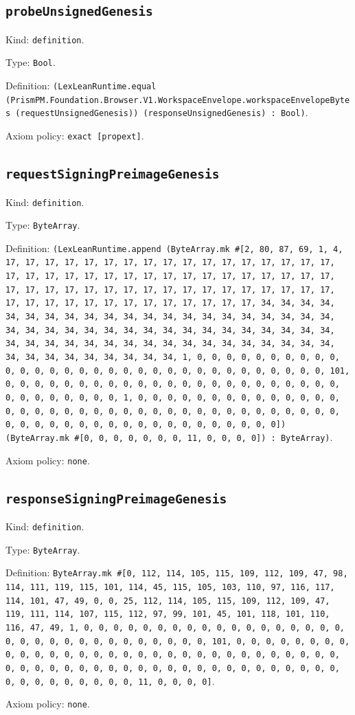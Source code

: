 \documentclass[11pt]{article}
\begin{document}
\subsection*{\texttt{probeUnsignedGenesis}}
\noindent Kind: \texttt{definition}.\par
\noindent Type: \texttt{Bool}.\par
\noindent Definition: \texttt{(LexLeanRuntime.equal (PrismPM.Foundation.Browser.V1.WorkspaceEnvelope.workspaceEnvelopeBytes (requestUnsignedGenesis)) (responseUnsignedGenesis) : Bool)}.\par
\noindent Axiom policy: \texttt{exact [propext]}.\par
\subsection*{\texttt{requestSigningPreimageGenesis}}
\noindent Kind: \texttt{definition}.\par
\noindent Type: \texttt{ByteArray}.\par
\noindent Definition: \texttt{(LexLeanRuntime.append (ByteArray.mk \#[2, 80, 87, 69, 1, 4, 17, 17, 17, 17, 17, 17, 17, 17, 17, 17, 17, 17, 17, 17, 17, 17, 17, 17, 17, 17, 17, 17, 17, 17, 17, 17, 17, 17, 17, 17, 17, 17, 17, 17, 17, 17, 17, 17, 17, 17, 17, 17, 17, 17, 17, 17, 17, 17, 17, 17, 17, 17, 17, 17, 17, 17, 17, 17, 17, 17, 17, 17, 17, 17, 34, 34, 34, 34, 34, 34, 34, 34, 34, 34, 34, 34, 34, 34, 34, 34, 34, 34, 34, 34, 34, 34, 34, 34, 34, 34, 34, 34, 34, 34, 34, 34, 34, 34, 34, 34, 34, 34, 34, 34, 34, 34, 34, 34, 34, 34, 34, 34, 34, 34, 34, 34, 34, 34, 34, 34, 34, 34, 34, 34, 34, 34, 34, 34, 1, 0, 0, 0, 0, 0, 0, 0, 0, 0, 0, 0, 0, 0, 0, 0, 0, 0, 0, 0, 0, 0, 0, 0, 0, 0, 0, 0, 0, 0, 0, 0, 0, 101, 0, 0, 0, 0, 0, 0, 0, 0, 0, 0, 0, 0, 0, 0, 0, 0, 0, 0, 0, 0, 0, 0, 0, 0, 0, 0, 0, 0, 0, 0, 0, 1, 0, 0, 0, 0, 0, 0, 0, 0, 0, 0, 0, 0, 0, 0, 0, 0, 0, 0, 0, 0, 0, 0, 0, 0, 0, 0, 0, 0, 0, 0, 0, 0, 0, 0, 0, 0, 0, 0, 0, 0, 0, 0, 0, 0, 0, 0, 0, 0, 0, 0, 0, 0, 0, 0, 0, 0]) (ByteArray.mk \#[0, 0, 0, 0, 0, 0, 0, 11, 0, 0, 0, 0]) : ByteArray)}.\par
\noindent Axiom policy: \texttt{none}.\par
\subsection*{\texttt{responseSigningPreimageGenesis}}
\noindent Kind: \texttt{definition}.\par
\noindent Type: \texttt{ByteArray}.\par
\noindent Definition: \texttt{ByteArray.mk \#[0, 112, 114, 105, 115, 109, 112, 109, 47, 98, 114, 111, 119, 115, 101, 114, 45, 115, 105, 103, 110, 97, 116, 117, 114, 101, 47, 49, 0, 0, 25, 112, 114, 105, 115, 109, 112, 109, 47, 119, 111, 114, 107, 115, 112, 97, 99, 101, 45, 101, 118, 101, 110, 116, 47, 49, 1, 0, 0, 0, 0, 0, 0, 0, 0, 0, 0, 0, 0, 0, 0, 0, 0, 0, 0, 0, 0, 0, 0, 0, 0, 0, 0, 0, 0, 0, 0, 0, 0, 101, 0, 0, 0, 0, 0, 0, 0, 0, 0, 0, 0, 0, 0, 0, 0, 0, 0, 0, 0, 0, 0, 0, 0, 0, 0, 0, 0, 0, 0, 0, 0, 0, 0, 0, 0, 0, 0, 0, 0, 0, 0, 0, 0, 0, 0, 0, 0, 0, 0, 0, 0, 0, 0, 0, 0, 0, 0, 0, 0, 0, 0, 0, 0, 11, 0, 0, 0, 0]}.\par
\noindent Axiom policy: \texttt{none}.\par
\end{document}
